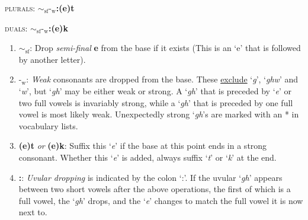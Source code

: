 \documentclass{article}
\begin{document}
\textsc{plurals}: \textbf{${\sim}_\text{sf}\text{-}_\text{w}$:(e)t}

\noindent \textsc{duals}: \textbf{${\sim}_\text{sf}\text{-}_\text{w}$:(e)k}

\begin{enumerate}
\item \textbf{${\sim}_\text{sf}$}: Drop \textit{semi-final} \textbf{e} from the base if it exists (This is an `e' that is followed by another letter).
\item \textbf{$\text{-}_\text{w}$}: \textit{Weak} consonants are dropped from the base. These \underline{exclude} `\textit{g}', `\textit{ghw}' and `\textit{w}', but `\textit{gh}' may be either weak or strong. A `\textit{gh}' that is preceded by `\textit{e}' or two full vowels is invariably strong, while a `\textit{gh}' that is preceded by one full vowel is most likely weak. Unexpectedly strong `\textit{gh}'s are marked with an * in vocabulary lists.
\item \textbf{(e)t} \textit{or} \textbf{(e)k}: Suffix this `\textit{e}' if the base at this point ends in a strong consonant. Whether this `\textit{e}' is added, always suffix `\textit{t}' or `\textit{k}' at the end.
\item \textbf{:}: \textit{Uvular dropping} is indicated by the colon `:'. If the uvular `\textit{gh}' appears between two short vowels after the above operations, the first of which is a full vowel, the `\textit{gh}' drops, and the `\textit{e}' changes to match the full vowel it is now next to.
\end{enumerate}
\end{document}
